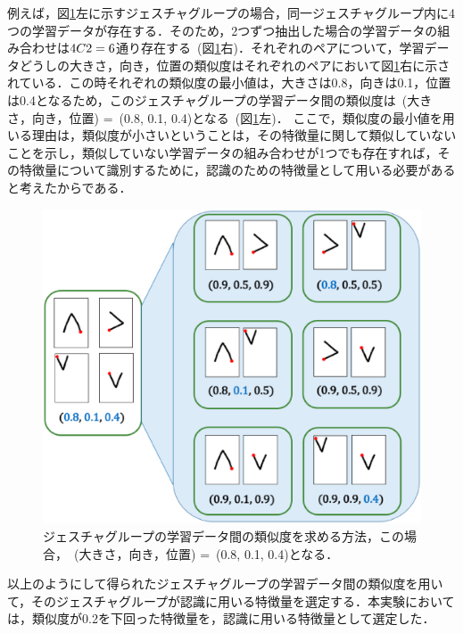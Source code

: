 例えば，図\ref{fig:group_similarity}左に示すジェスチャグループの場合，同一ジェスチャグループ内に4つの学習データが存在する．そのため，2つずつ抽出した場合の学習データの組み合わせは${\scriptsize 4}C{\scriptsize 2}=6$通り存在する~(図\ref{fig:group_similarity}右)．それぞれのペアについて，学習データどうしの大きさ，向き，位置の類似度はそれぞれのペアにおいて図\ref{fig:group_similarity}右に示されている．この時それぞれの類似度の最小値は，大きさは0.8，向きは0.1，位置は0.4となるため，このジェスチャグループの学習データ間の類似度は~(大きさ，向き，位置) =~(0.8, 0.1, 0.4)となる~(図\ref{fig:group_similarity}左)．
ここで，類似度の最小値を用いる理由は，類似度が小さいということは，その特徴量に関して類似していないことを示し，類似していない学習データの組み合わせが1つでも存在すれば，その特徴量について識別するために，認識のための特徴量として用いる必要があると考えたからである．

\begin{figure} [h!]
	\begin{center}
		\includegraphics [width=0.7\hsize ]{img/group_similarity.eps}
	\end{center}
	\caption{ジェスチャグループの学習データ間の類似度を求める方法，この場合，~(大きさ，向き，位置) =~(0.8, 0.1, 0.4)となる．}
	\label{fig:group_similarity}
\end{figure}

以上のようにして得られたジェスチャグループの学習データ間の類似度を用いて，そのジェスチャグループが認識に用いる特徴量を選定する．本実験においては，類似度が0.2を下回った特徴量を，認識に用いる特徴量として選定した．


